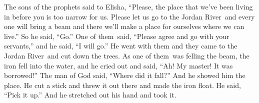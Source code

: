 
\begin{inparaenum}
   The sons of the prophets said to Elisha, ``Please, the place that we've been living in before you is too narrow for us.%
   Please let us go to the Jordan River\understood{}\ and every one will bring a beam and there we'll make a place for ourselves where we can live.'' So he said, ``Go.''%
   One of them\understood{}\ said, ``Please agree and go with your servants,'' and he said, ``I will go.''%
   He went with them and they came to the Jordan River\understood{}\ and cut down the trees.%
   As one of them\understood{}\ was felling the beam, the iron fell into the water, and he cried out and said, ``Ah! My master! It was borrowed!''%
   The man of God said, ``Where did it fall?'' And he showed him the place. He cut a stick and threw it out there and made the iron float.%
   He said, ``Pick it up.'' And he stretched out his hand and took it.%


\end{inparaenum}
